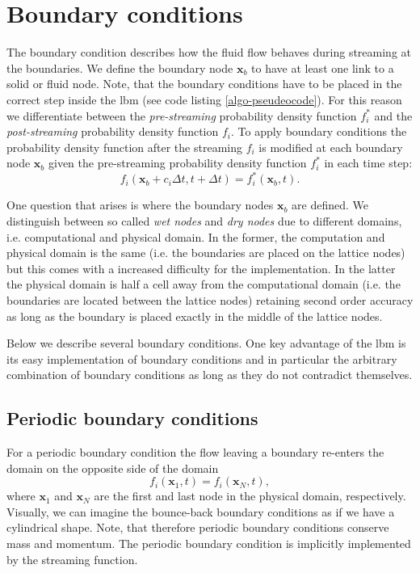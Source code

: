\documentclass[a4paper,11pt, footsepline]{book}
\begin{document}
\section{Boundary conditions}\label{sec-boundaryConditions}
The boundary condition describes how the fluid flow behaves during streaming at the boundaries. We define the boundary node $\mathbf{x}_{b}$ to have at least one link to a solid or fluid node. 
Note, that the boundary conditions have to be placed in the correct step inside the \ac{lbm} (see code listing \ref{algo-pseudeocode}). For this reason we differentiate between the \textit{pre-streaming} probability density function $f_{i}^{\ast}$ and the \textit{post-streaming} probability density function $f_{i}$.
To apply boundary conditions the probability density function after the streaming $f_i$ is modified at each boundary node $\mathbf{x}_{b}$ given the pre-streaming probability density function $f_{i}^{\ast}$ in each time step:
\begin{equation}
f_i(\mathbf{x}_{b}+c_{i}\Delta t, t+\Delta t)=f_{i}^{\ast}(\mathbf{x}_b,t).
\end{equation}

One question that arises is where the boundary nodes $\mathbf{x}_b$ are defined. We distinguish between so called \textit{wet nodes} and \textit{dry nodes} due to different domains, i.e. computational and physical domain. In the former, the computation and physical domain is the same (i.e. the boundaries are placed on the lattice nodes) but this comes with a increased difficulty for the implementation. In the latter the physical domain is half a cell away from the computational domain (i.e. the boundaries are located between the lattice nodes) retaining second order accuracy as long as the boundary is placed exactly in the middle of the lattice nodes.

Below we describe several boundary conditions. One key advantage of the \ac{lbm} is its easy implementation of boundary conditions and in particular the arbitrary combination of boundary conditions as long as they do not contradict themselves.
\subsection*{Periodic boundary conditions}
For a periodic boundary condition the flow leaving a boundary re-enters the domain on the opposite side of the domain
\begin{equation}
f_{i}(\mathbf{x}_{1},t)=f_{i}(\mathbf{x}_{N},t),
\end{equation}
where $\mathbf{x}_{1}$ and $\mathbf{x}_{N}$ are the first and last node in the physical domain, respectively. Visually, we can imagine the bounce-back boundary conditions as if we have a cylindrical shape. Note, that therefore periodic boundary conditions conserve mass and momentum.
The periodic boundary condition is implicitly implemented by the streaming function.
\end{document}
